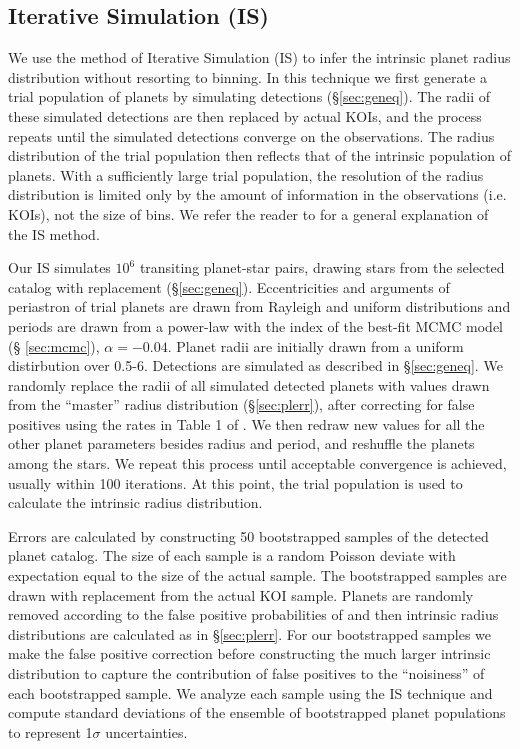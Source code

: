 \subsection{Iterative Simulation (IS)}
\label{sec:IS}  
We use the method of Iterative Simulation (IS) to infer the intrinsic 
planet radius distribution without resorting to binning.  
In this technique we first generate a trial population of planets by 
simulating detections (\S \ref{sec:geneq}).  The radii of
these simulated detections are then replaced by actual KOIs, and the process
repeats until the simulated detections converge on the observations.
The radius distribution of the trial population then reflects that of
the intrinsic population of planets.  With a sufficiently large trial
population, the resolution of the radius distribution is limited only
by the amount of information in the observations (i.e. KOIs), not the 
size of bins.  We refer the reader to \citet{Gelman92} for a general
explanation of the IS method.

Our IS simulates $10^6$ transiting planet-star pairs, drawing stars
from the selected catalog with replacement (\S\ref{sec:geneq}).
Eccentricities and arguments of periastron of trial planets are drawn
from Rayleigh and uniform distributions and periods are drawn from a
power-law with the index of the best-fit MCMC model (\S
\ref{sec:mcmc}), $\alpha=-0.04$.  Planet radii are initially drawn
from a uniform distirbution over 0.5-6\rearth{}.  Detections are
simulated as described in \S \ref{sec:geneq}.  We randomly
replace the radii of all simulated detected planets with values drawn
from the ``master'' radius distribution (\S\ref{sec:plerr}), 
after correcting for false positives using
the rates in Table 1 of \cite{Fressin2013}.  We then redraw new values
for all the other planet parameters besides radius and period, and
reshuffle the planets among the stars.  We repeat this process until
acceptable convergence is achieved, usually within 100 iterations.  At
this point, the trial population is used to calculate the intrinsic
radius distribution.

Errors are calculated by constructing 50 bootstrapped samples of the
detected planet catalog.  The size of each sample is a random Poisson
deviate with expectation equal to the size of the actual sample.  The
bootstrapped samples are drawn with replacement from the actual
KOI sample.  Planets are randomly removed according to the false
positive probabilities of \citet{Fressin2013} and then intrinsic
radius distributions are calculated as in \S \ref{sec:plerr}.
For our bootstrapped samples we make the false positive correction 
before constructing the much larger intrinsic distribution to 
capture the contribution of false positives to the ``noisiness'' 
of each bootstrapped sample. We analyze each sample using the IS technique 
and compute standard deviations of the ensemble of bootstrapped
planet populations to represent 1$\sigma$ uncertainties.


